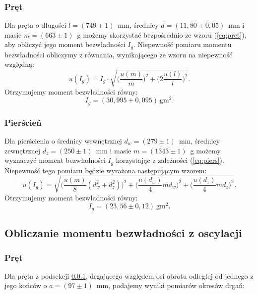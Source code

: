 \documentclass[12pt,a4paper]{article}
\numberwithin{equation}{section}
\begin{document}
\subsubsection{Pręt}
\label{sec:pret}
Dla pręta o długości $l = (749 \pm 1)$~mm, średnicy $d = (11,80 \pm 0,05)$~mm i masie
$m = (663 \pm 1)$~g możemy skorzystać bezpośrednio ze wzoru (\ref{eq:pret}), aby obliczyć jego moment bezwładności $I_g$. Niepewność pomiaru momentu bezwładności obliczymy z równania, wynikającego ze wzoru na niepewność względną:
\begin{equation}
	u(I_g) = I_g \cdot \sqrt{\Bigg(\frac{u(m)}{m}\Bigg)^2 + \Bigg(2\frac{u(l)}{l}\Bigg)^2}.
\end{equation}
Otrzymujemy moment bezwładności równy:
\begin{equation}
	I_g = (30,995 + 0,095)~\textrm{gm}^2.
\end{equation}

\subsubsection{Pierścień}
\label{sec:piers}
Dla pierścienia o średnicy wewnętrznej $d_w = (279 \pm 1)$~mm, średnicy zewnętrznej $d_z = (250 \pm 1)$~mm i masie $m = (1343 \pm 1)$~g możemy wyznaczyć moment bezwładności $I_g$ korzystając z zależności (\ref{eq:piers}). Niepewność tego pomiaru będzie wyrażona następującym wzorem:
\begin{equation}
	u(I_g) = \sqrt{\Bigg(\frac{u(m)}{8} (d_w^2 + d_z^2)\Bigg)^2 + \Bigg(\frac{u(d_w)}{4} m d_w\Bigg)^2 + \Bigg(\frac{u(d_z)}{4} m d_z\Bigg)^2}.
\end{equation}
Otrzymujemy moment bezwładności równy:
\begin{equation}
I_g = (23,56\pm 0,12)~\textrm{gm}^2.
\end{equation}

\subsection{Obliczanie momentu bezwładności z oscylacji}
\subsubsection{Pręt}

Dla pręta z podsekcji \ref{sec:pret}, drgającego względem osi obrotu odległej od jednego z jego końców o $a = (97 \pm 1)$~mm, podajemy wyniki pomiarów okresów drgań:
\end{document}
